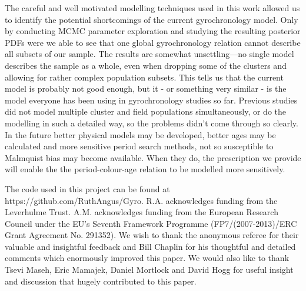 \documentclass[useAMS, usenatbib]{mn2e}
\begin{document}
The careful and well motivated modelling techniques used in this work
allowed us to identify the potential shortcomings of the current
gyrochronology model.
Only by conducting MCMC parameter exploration and studying the resulting
posterior PDFs were we able to see that one global gyrochronology relation
cannot describe all subsets of our sample.
The results are somewhat unsettling---no single model describes the sample as
a whole, even when dropping some of the clusters and allowing for rather
complex population subsets.
This tells us that the current model is probably not good enough, but it - or
something very similar - is the model everyone has been using in
gyrochronology studies so far.
Previous studies did not model multiple cluster and field populations
simultaneously, or do the modelling in such a detailed way, so the problems
didn’t come through so clearly.
In the future better physical models may be developed, better ages may be
calculated and more sensitive period search methods, not so susceptible to
Malmquist bias may become available.
When they do, the prescription we provide will enable the the
period-colour-age relation to be modelled more sensitively.




The code used in this project can be found at
https://github.com/RuthAngus/Gyro.
R.A. acknowledges funding from the Leverhulme Trust.
A.M. acknowledges funding from the European Research Council under the EU’s
Seventh Framework Programme (FP7/(2007-2013)/ERC Grant Agreement No. 291352).
We wish to thank the anonymous referee for their valuable and insightful
feedback and Bill Chaplin for his thoughtful and detailed comments
which enormously improved this paper.
We would also like to thank Tsevi Maseh, Eric Mamajek, Daniel Mortlock and
David Hogg for useful insight and discussion that hugely contributed to this
paper.



\end{document}
